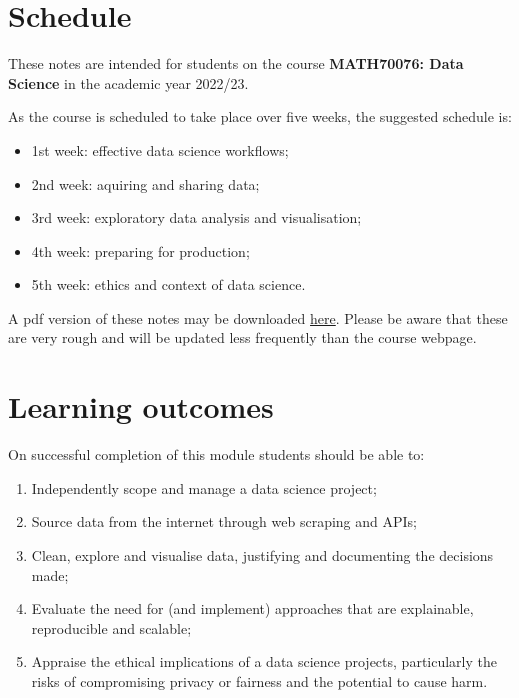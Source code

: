 \documentclass[
  12pt,
]{book}
\providecommand{\tightlist}{%
  \setlength{\itemsep}{0pt}\setlength{\parskip}{0pt}}
\begin{document}
\hypertarget{schedule}{%
\section*{Schedule}\label{schedule}}

These notes are intended for students on the course \textbf{MATH70076: Data Science} in the academic year 2022/23.

As the course is scheduled to take place over five weeks, the suggested schedule is:

\begin{itemize}
\tightlist
\item
  1st week: effective data science workflows;
\item
  2nd week: aquiring and sharing data;
\item
  3rd week: exploratory data analysis and visualisation;
\item
  4th week: preparing for production;
\item
  5th week: ethics and context of data science.
\end{itemize}

A pdf version of these notes may be downloaded \href{./data_science_notes.pdf}{here}. Please be aware that these are very rough and will be updated less frequently than the course webpage.

\hypertarget{learning-outcomes}{%
\section*{Learning outcomes}\label{learning-outcomes}}

On successful completion of this module students should be able to:

\begin{enumerate}
\def\labelenumi{\arabic{enumi}.}
\tightlist
\item
  Independently scope and manage a data science project;
\item
  Source data from the internet through web scraping and APIs;
\item
  Clean, explore and visualise data, justifying and documenting the decisions made;
\item
  Evaluate the need for (and implement) approaches that are explainable, reproducible and scalable;
\item
  Appraise the ethical implications of a data science projects, particularly the risks of compromising privacy or fairness and the potential to cause harm.
\end{enumerate}
\end{document}
